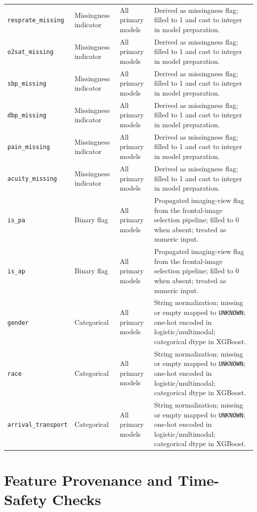 \begin{longtable}{p{2.6cm} p{2.2cm} p{2.3cm} p{6.8cm}}
\texttt{resprate\_missing} & Missingness indicator & All primary models & Derived as missingness flag; filled to 1 and cast to integer in model preparation. \\
\texttt{o2sat\_missing} & Missingness indicator & All primary models & Derived as missingness flag; filled to 1 and cast to integer in model preparation. \\
\texttt{sbp\_missing} & Missingness indicator & All primary models & Derived as missingness flag; filled to 1 and cast to integer in model preparation. \\
\texttt{dbp\_missing} & Missingness indicator & All primary models & Derived as missingness flag; filled to 1 and cast to integer in model preparation. \\
\texttt{pain\_missing} & Missingness indicator & All primary models & Derived as missingness flag; filled to 1 and cast to integer in model preparation. \\
\texttt{acuity\_missing} & Missingness indicator & All primary models & Derived as missingness flag; filled to 1 and cast to integer in model preparation. \\
\texttt{is\_pa} & Binary flag & All primary models & Propagated imaging-view flag from the frontal-image selection pipeline; filled to 0 when absent; treated as numeric input. \\
\texttt{is\_ap} & Binary flag & All primary models & Propagated imaging-view flag from the frontal-image selection pipeline; filled to 0 when absent; treated as numeric input. \\
\texttt{gender} & Categorical & All primary models & String normalization; missing or empty mapped to \texttt{UNKNOWN}; one-hot encoded in logistic/multimodal; categorical dtype in XGBoost. \\
\texttt{race} & Categorical & All primary models & String normalization; missing or empty mapped to \texttt{UNKNOWN}; one-hot encoded in logistic/multimodal; categorical dtype in XGBoost. \\
\texttt{arrival\_transport} & Categorical & All primary models & String normalization; missing or empty mapped to \texttt{UNKNOWN}; one-hot encoded in logistic/multimodal; categorical dtype in XGBoost. \\
\bottomrule
\end{longtable}
\normalsize

\section{Feature Provenance and Time-Safety Checks}

